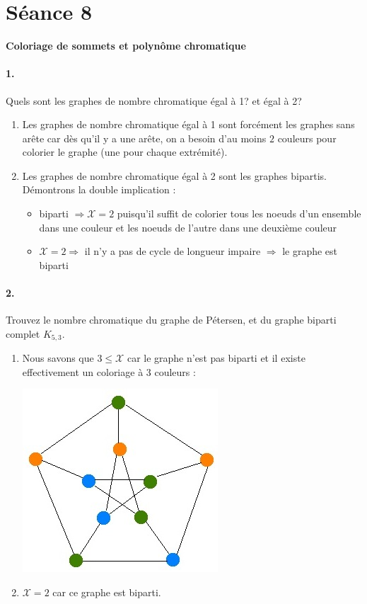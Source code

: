 \section{Séance 8}

\textbf{Coloriage de sommets et polynôme chromatique}

\paragraph{1. } Quels sont les graphes de nombre chromatique égal à 1? et égal à 2?
\begin{solution}
  \begin{enumerate}
    \item Les graphes de nombre chromatique égal à 1 sont forcément les graphes sans arête car dès qu'il y a une arête, on a besoin d'au moins $2$ couleurs pour colorier le graphe (une pour chaque extrémité).
    \item Les graphes de nombre chromatique égal à 2 sont les graphes bipartis. Démontrons la double implication :
    \begin{itemize}
    \item biparti $\Rightarrow \mathcal{X} = 2 $ puisqu'il suffit de colorier tous les noeuds d'un ensemble dans une couleur et les noeuds de l'autre dans une deuxième couleur
    \item $\mathcal{X} = 2 \Rightarrow$ il n'y a pas de cycle de longueur impaire $\Rightarrow$ le graphe est biparti
     \end{itemize}
  \end{enumerate}
\end{solution}

\paragraph{2. } Trouvez le nombre chromatique du graphe de Pétersen, et du graphe biparti complet $K_{5,3}$.
\begin{solution}
  \begin{enumerate}
    \item Nous savons que $3 \leq \mathcal{X}$ car le graphe n'est pas biparti et il existe effectivement un coloriage à  $3$ couleurs :
    \begin{center}
    	\includegraphics[scale=0.4]{seance8ex2}
     \end{center}
    \item  $\mathcal{X} = 2$ car ce graphe est biparti.
  \end{enumerate}
\end{solution}

